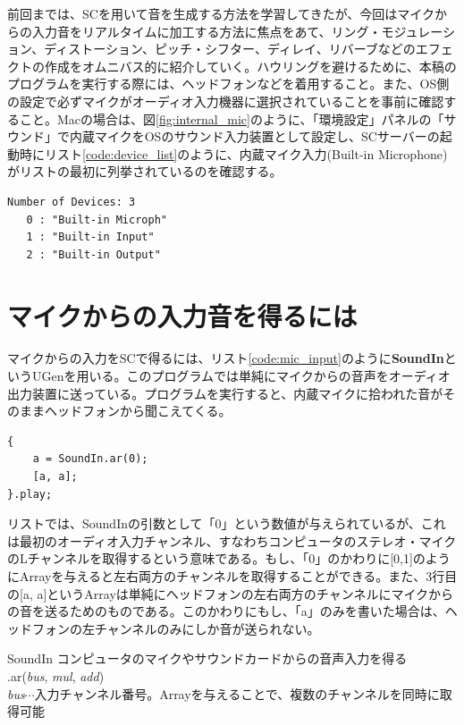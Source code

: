 \documentclass{jsarticle}
\begin{document}
\begin{figure}

\end{figure}
前回までは、SCを用いて音を生成する方法を学習してきたが、今回はマイクからの入力音をリアルタイムに加工する方法に焦点をあて、リング・モジュレーション、ディストーション、ピッチ・シフター、ディレイ、リバーブなどのエフェクトの作成をオムニバス的に紹介していく。ハウリングを避けるために、本稿のプログラムを実行する際には、ヘッドフォンなどを着用すること。また、OS側の設定で必ずマイクがオーディオ入力機器に選択されていることを事前に確認すること。Macの場合は、図\ref{fig:internal_mic}のように、「環境設定」パネルの「サウンド」で内蔵マイクをOSのサウンド入力装置として設定し、SCサーバーの起動時にリスト\ref{code:device_list}のように、内蔵マイク入力(Built-in Microphone)がリストの最初に列挙されているのを確認する。

\begin{lstlisting}[caption=入出力デバイスのリスト,label=code:device_list]
Number of Devices: 3
   0 : "Built-in Microph"
   1 : "Built-in Input"
   2 : "Built-in Output"
\end{lstlisting}

\section{マイクからの入力音を得るには}
マイクからの入力をSCで得るには、リスト\ref{code:mic_input}のように{\bf SoundIn}というUGenを用いる。このプログラムでは単純にマイクからの音声をオーディオ出力装置に送っている。プログラムを実行すると、内蔵マイクに拾われた音がそのままヘッドフォンから聞こえてくる。

\begin{lstlisting}[caption=マイク入力,label=code:mic_input]
{
	a = SoundIn.ar(0);
	[a, a];
}.play;
\end{lstlisting}

リストでは、SoundInの引数として「0」という数値が与えられているが、これは最初のオーディオ入力チャンネル、すなわちコンピュータのステレオ・マイクのLチャンネルを取得するという意味である。もし、「0」のかわりに[0,1]のようにArrayを与えると左右両方のチャンネルを取得することができる。また、3行目の[a, a]というArrayは単純にヘッドフォンの左右両方のチャンネルにマイクからの音を送るためのものである。このかわりにもし、「a」のみを書いた場合は、ヘッドフォンの左チャンネルのみにしか音が送られない。
\begin{itembox}[l]{SoundIn}
{\footnotesize 
コンピュータのマイクやサウンドカードからの音声入力を得る\\
.ar({\it bus}, {\it mul}, {\it add})\\
{\it bus}$\cdots$入力チャンネル番号。Arrayを与えることで、複数のチャンネルを同時に取得可能\\
}
\end{itembox}
\end{document}
